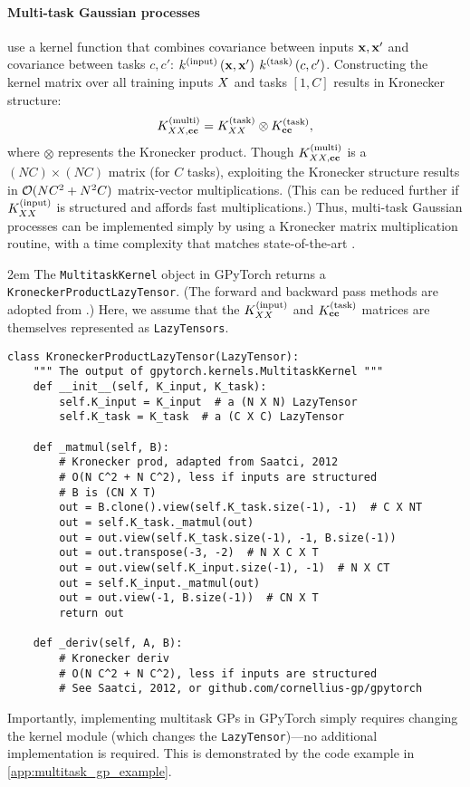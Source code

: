 \paragraph{Multi-task Gaussian processes} \cite{bonilla2008multi} use a kernel function that combines covariance between inputs $\mathbf{x}, \mathbf{x}'$ and covariance between tasks $c, c'$:
$k^{(\text{input})} \left( \mathbf{x}, \mathbf{x}' \right) \: k^{(\text{task})} \left( c, c' \right)$.
Constructing the kernel matrix over all training inputs $X$ and tasks $[1, C]$ results in Kronecker structure:
%
\[
  K_{XX, \mathbf{c}\mathbf{c}}^{(\text{multi})} = K^{(\text{task})}_{XX} \otimes K^{(\text{task})}_{\mathbf{c}\mathbf{c}},
\]
%
where $\otimes$ represents the Kronecker product.
Though $K_{XX, \mathbf{c}\mathbf{c}}^{(\text{multi})}$ is a $(NC) \times (NC)$ matrix (for $C$ tasks), exploiting the Kronecker structure results in $\bigo{N C^2 + N^2 C}$ matrix-vector multiplications.
(This can be reduced further if $K^{(\text{input})}_{XX}$ is structured and affords fast multiplications.)
Thus, multi-task Gaussian processes can be implemented simply by using a Kronecker matrix multiplication routine, with a time complexity that matches state-of-the-art \citep{bonilla2008multi}.

\emergencystretch 2em
The {\tt MultitaskKernel} object in GPyTorch returns a {\tt KroneckerProductLazyTensor}.
(The forward and backward pass methods are adopted from \citet{saatcci2012scalable}.)
Here, we assume that the $K^{(\text{input})}_{XX}$ and $K^{(\text{task})}_{\mathbf{c}\mathbf{c}}$ matrices are themselves represented as {\tt LazyTensors}.
%
\begin{verbatim}
class KroneckerProductLazyTensor(LazyTensor):
    """ The output of gpytorch.kernels.MultitaskKernel """
    def __init__(self, K_input, K_task):
        self.K_input = K_input  # a (N X N) LazyTensor
        self.K_task = K_task  # a (C X C) LazyTensor

    def _matmul(self, B):
        # Kronecker prod, adapted from Saatci, 2012
        # O(N C^2 + N C^2), less if inputs are structured
        # B is (CN X T)
        out = B.clone().view(self.K_task.size(-1), -1)  # C X NT
        out = self.K_task._matmul(out)
        out = out.view(self.K_task.size(-1), -1, B.size(-1))
        out = out.transpose(-3, -2)  # N X C X T
        out = out.view(self.K_input.size(-1), -1)  # N X CT
        out = self.K_input._matmul(out)
        out = out.view(-1, B.size(-1))  # CN X T
        return out

    def _deriv(self, A, B):
        # Kronecker deriv
        # O(N C^2 + N C^2), less if inputs are structured
        # See Saatci, 2012, or github.com/cornellius-gp/gpytorch
\end{verbatim}
%
\noindent
Importantly, implementing multitask GPs in GPyTorch simply requires changing the kernel module (which changes the {\tt LazyTensor})---no additional implementation is required.
This is demonstrated by the code example in \cref{app:multitask_gp_example}.

